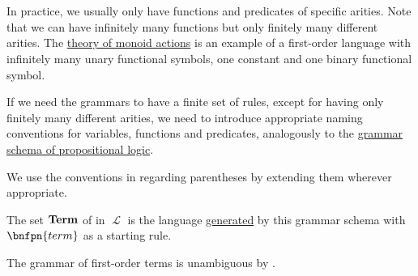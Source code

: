 \begin{definition}
\begin{thmenum}
\begin{bnf*}
       \\
      \bnfmore                  {\hspace{3cm} \vdots} \\
       \\
      \bnfmore                  {\hspace{3cm} \vdots} \\
               { \bnfor} \\
       \\
       \\
    \end{bnf*}

    In practice, we usually only have functions and predicates of specific arities. Note that we can have infinitely many functions but only finitely many different arities. The \hyperref[rem:theory_of_left_monoid_actions]{theory of monoid actions} is an example of a first-order language with infinitely many unary functional symbols, one constant and one binary functional symbol.

    If we need the grammars to have a finite set of rules, except for having only finitely many different arities, we need to introduce appropriate naming conventions for variables, functions and predicates, analogously to the \hyperref[def:propositional_syntax/grammar_schema]{grammar schema of propositional logic}.

    We use the conventions in  regarding parentheses by extending them wherever appropriate.

     The set \( \operatorname{\mathbf{Term}} \) of  in \( \mscrL \) is the language \hyperref[def:grammar_derivation/grammar_language]{generated} by this grammar schema with \( \bnfpn{term} \) as a starting rule.

    The grammar of first-order terms is unambiguous by .


\end{thmenum}
\end{definition}

